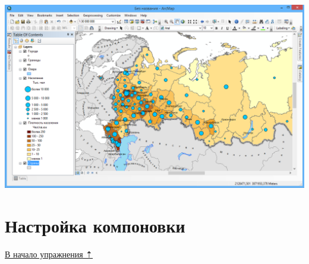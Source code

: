 \documentclass[]{book}
\theoremstyle{definition}
\theoremstyle{definition}
\theoremstyle{definition}
\theoremstyle{remark}
\begin{document}
\begin{enumerate}
  \includegraphics{images/Ex02/image28.png}
\end{enumerate}

\hypertarget{map-design-economic-layout}{%
\section{Настройка компоновки}\label{map-design-economic-layout}}

\protect\hyperlink{map-design-economic}{В начало упражнения ⇡}
\end{document}
